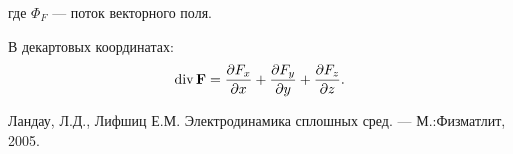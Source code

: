 \documentclass[a4paper,10pt]{article}
\begin{document}
где $\Phi_F$ --- поток векторного поля.

В декартовых координатах:
\begin{equation} \label{eq:div_dec}
\operatorname{div}\boldsymbol{\mathbf{F}}=\frac{\partial F_x}{\partial x}+\frac{\partial F_y}{\partial y}+\frac{\partial F_z}{\partial z}.
\end{equation}

\begin{thebibliography}{99}
 Ландау, Л.Д., Лифшиц Е.М. Электродинамика сплошных сред. --- М.:Физматлит, 2005.
\end{thebibliography}
\end{document}
